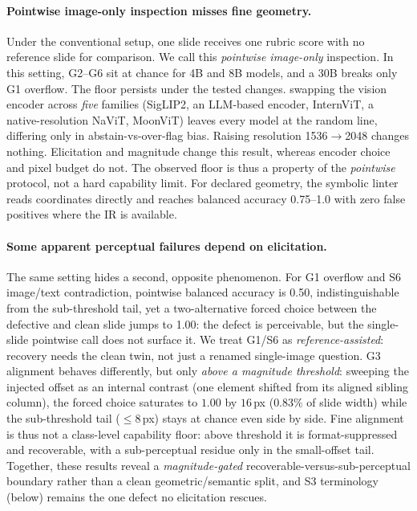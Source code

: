 \documentclass[letterpaper]{article}            %
\newcommand{\g}[1]{\textsf{#1}}        %
\begin{document}
\paragraph{Pointwise image-only inspection misses fine geometry.}
Under the conventional setup, one slide receives one rubric score with no reference slide for comparison. We
call this \emph{pointwise image-only} inspection. In this setting, \g{G2}--\g{G6} sit at chance for 4B and 8B models, and a 30B breaks only
\g{G1} overflow. The floor persists under the tested changes. swapping the vision encoder across \emph{five}
families (SigLIP2, an LLM-based encoder, InternViT, a native-resolution NaViT, MoonViT) leaves every model at
the random line, differing only in abstain-vs-over-flag bias. Raising resolution 1536$\to$2048 changes
nothing. Elicitation and magnitude change this result, whereas encoder choice and pixel budget do not. The observed floor is thus a property of
the \emph{pointwise} protocol, not a hard capability limit. For declared geometry, the symbolic linter reads coordinates directly and reaches balanced accuracy 0.75--1.0
with zero false positives where the IR is available.

\paragraph{Some apparent perceptual failures depend on elicitation.}
The same setting hides a second, opposite phenomenon. For \g{G1} overflow and \g{S6} image/text contradiction,
pointwise balanced accuracy is 0.50, indistinguishable from the sub-threshold tail, yet a
two-alternative forced choice between the defective and clean slide jumps to 1.00: the defect is perceivable,
but the single-slide pointwise call does not surface it. We treat \g{G1}/\g{S6} as
\emph{reference-assisted}: recovery needs the clean twin, not just a renamed single-image question. \g{G3}
alignment behaves differently, but only \emph{above a magnitude threshold}: sweeping the injected offset as an
internal contrast (one element shifted from its aligned sibling column), the forced choice saturates to $1.00$
by $16$\,px ($0.83\%$ of slide width) while the sub-threshold tail ($\le8$\,px) stays at chance even side by
side. Fine alignment is thus not a class-level capability floor: above threshold it is format-suppressed and
recoverable, with a sub-perceptual residue only in the small-offset tail. Together, these results reveal a
\emph{magnitude-gated} recoverable-versus-sub-perceptual boundary rather than a clean geometric/semantic split,
and \g{S3} terminology (below) remains the one defect no elicitation rescues.
\end{document}
